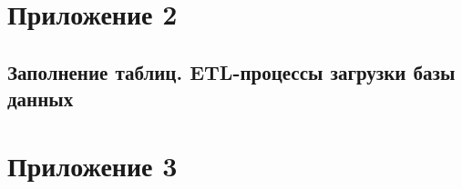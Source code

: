 \documentclass[a4paper]{article}
\begin{document}
\section*{\hfill Приложение 2\hfill}
\subsection{Заполнение таблиц. ETL-процессы загрузки базы данных}

\subsubsection{}
\label{subsec:python1}

\subsubsection{}
\label{subsec:python2}

\subsubsection{}
\label{subsec:python3}

\subsubsection{}
\label{subsec:python4}

\subsubsection{}
\label{subsec:python5}


\section*{\hfill Приложение 3\hfill}
\end{document}
